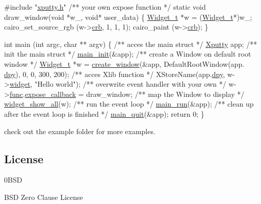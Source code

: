 \begin{DoxyCode}
\textcolor{preprocessor}{#include "\hyperlink{xputty_8h}{xputty.h}"}
\textcolor{comment}{}
\textcolor{comment}{/** your own expose function */}
\textcolor{keyword}{static} \textcolor{keywordtype}{void} draw\_window(\textcolor{keywordtype}{void} *w\_, \textcolor{keywordtype}{void}* user\_data) \{
    \hyperlink{structWidget__t}{Widget\_t} *w = (\hyperlink{structWidget__t}{Widget\_t}*)w\_;
    cairo\_set\_source\_rgb (w->\hyperlink{structWidget__t_ad98022ee160d4c0906110868fc9e5664}{crb}, 1, 1, 1);
    cairo\_paint (w->\hyperlink{structWidget__t_ad98022ee160d4c0906110868fc9e5664}{crb});
\}

\textcolor{keywordtype}{int} main (\textcolor{keywordtype}{int} argc, \textcolor{keywordtype}{char} ** argv)
\{\textcolor{comment}{}
\textcolor{comment}{    /** acces the main struct */}
    \hyperlink{structXputty}{Xputty} app;\textcolor{comment}{}
\textcolor{comment}{    /** init the main struct */}
    \hyperlink{xputty_8c_a484645d624d9e9eff0288f8d5583ff5e}{main\_init}(&app);\textcolor{comment}{}
\textcolor{comment}{    /** create a Window on default root window */}
    \hyperlink{structWidget__t}{Widget\_t} *w = \hyperlink{xwidget_8c_a5528f841e6b5f2ef62b3b10bfa8bf20f}{create\_window}(&app, DefaultRootWindow(app.
      \hyperlink{structXputty_ab185ae4fd00ee1930c61e0440734878f}{dpy}), 0, 0, 300, 200);\textcolor{comment}{}
\textcolor{comment}{    /** acces Xlib function */}
    XStoreName(app.\hyperlink{structXputty_ab185ae4fd00ee1930c61e0440734878f}{dpy}, w->\hyperlink{structWidget__t_acb2bfb41674371ee1220a9d6a2d89fb1}{widget}, \textcolor{stringliteral}{"Hello world"});\textcolor{comment}{}
\textcolor{comment}{    /** overwrite event handler with your own */}
    w->\hyperlink{structWidget__t_a225b9a175e132994a5aa73b59a2911ad}{func}.\hyperlink{structFunc__t_ae4ba307ec29bfea83e1197aa750c1396}{expose\_callback} = draw\_window;\textcolor{comment}{}
\textcolor{comment}{    /** map the Window to display */}
    \hyperlink{xwidget_8c_aae228a75c93bb0cb9ad57ffaf4d25922}{widget\_show\_all}(w);\textcolor{comment}{}
\textcolor{comment}{    /** run the event loop */}
    \hyperlink{xputty_8c_abb548ea64f852a7c94473a595e67d69f}{main\_run}(&app);\textcolor{comment}{}
\textcolor{comment}{    /** clean up after the event loop is finished */}
    \hyperlink{xputty_8c_a0d4eda902b4de6f7a30e8d869f842fda}{main\_quit}(&app);
    \textcolor{keywordflow}{return} 0;
\}
\end{DoxyCode}


check out the example folder for more examples.

\subsection*{License}

\begin{DoxyVerb}     0BSD 
\end{DoxyVerb}
 B\+SD Zero Clause License 